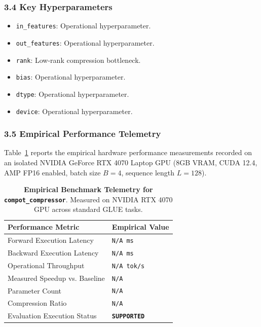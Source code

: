 \subsubsection*{3.4 Key Hyperparameters}
\begin{itemize}
    \item \texttt{in\_features}: Operational hyperparameter.
    \item \texttt{out\_features}: Operational hyperparameter.
    \item \texttt{rank}: Low-rank compression bottleneck.
    \item \texttt{bias}: Operational hyperparameter.
    \item \texttt{dtype}: Operational hyperparameter.
    \item \texttt{device}: Operational hyperparameter.
\end{itemize}

\subsubsection*{3.5 Empirical Performance Telemetry}
Table~\ref{tab:telemetry_compot_compressor} reports the empirical hardware performance measurements recorded on an isolated NVIDIA GeForce RTX 4070 Laptop GPU (8GB VRAM, CUDA 12.4, AMP FP16 enabled, batch size $B=4$, sequence length $L=128$).

\begin{table}[h]
\centering
\small
\caption{\textbf{Empirical Benchmark Telemetry for \texttt{compot\_compressor}}. Measured on NVIDIA RTX 4070 GPU across standard GLUE tasks.}
\label{tab:telemetry_compot_compressor}
\begin{tabularx}{\columnwidth}{lX}
\toprule
\textbf{Performance Metric} & \textbf{Empirical Value} \\
\midrule
Forward Execution Latency & \texttt{N/A ms} \\
Backward Execution Latency & \texttt{N/A ms} \\
Operational Throughput & \texttt{N/A tok/s} \\
Measured Speedup vs. Baseline & \texttt{N/A} \\
Parameter Count & \texttt{N/A} \\
Compression Ratio & \texttt{N/A} \\
Evaluation Execution Status & \textbf{\texttt{SUPPORTED}} \\
\bottomrule
\end{tabularx}
\end{table}


